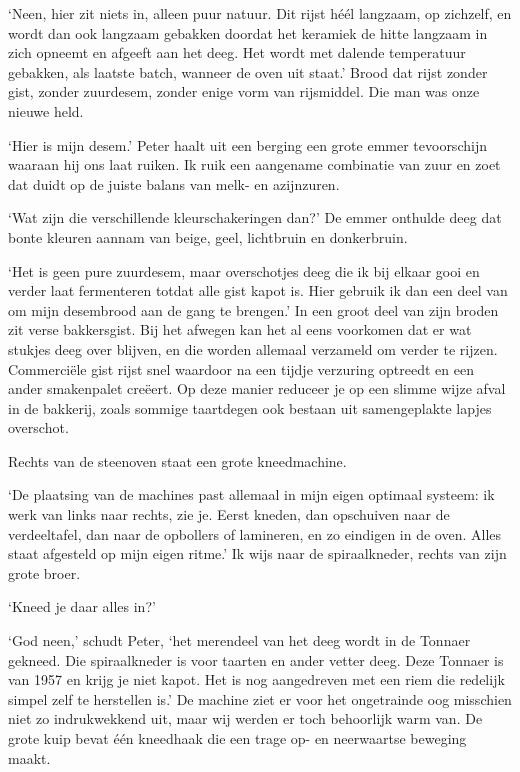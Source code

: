 \documentclass[
  11pt,
  dutch,
]{memoir}
\begin{document}
`Neen, hier zit niets in, alleen puur natuur. Dit rijst héél langzaam,
op zichzelf, en wordt dan ook langzaam gebakken doordat het keramiek de
hitte langzaam in zich opneemt en afgeeft aan het deeg. Het wordt met
dalende temperatuur gebakken, als laatste batch, wanneer de oven uit
staat.' Brood dat rijst zonder gist, zonder zuurdesem, zonder enige vorm
van rijsmiddel. Die man was onze nieuwe held.

`Hier is mijn desem.' Peter haalt uit een berging een grote emmer
tevoorschijn waaraan hij ons laat ruiken. Ik ruik een aangename
combinatie van zuur en zoet dat duidt op de juiste balans van melk- en
azijnzuren.

`Wat zijn die verschillende kleurschakeringen dan?' De emmer onthulde
deeg dat bonte kleuren aannam van beige, geel, lichtbruin en
donkerbruin.

`Het is geen pure zuurdesem, maar overschotjes deeg die ik bij elkaar
gooi en verder laat fermenteren totdat alle gist kapot is. Hier gebruik
ik dan een deel van om mijn desembrood aan de gang te brengen.' In een
groot deel van zijn broden zit verse bakkersgist. Bij het afwegen kan
het al eens voorkomen dat er wat stukjes deeg over blijven, en die
worden allemaal verzameld om verder te rijzen. Commerciële gist rijst
snel waardoor na een tijdje verzuring optreedt en een ander smakenpalet
creëert. Op deze manier reduceer je op een slimme wijze afval in de
bakkerij, zoals sommige taartdegen ook bestaan uit samengeplakte lapjes
overschot.

Rechts van de steenoven staat een grote kneedmachine.

`De plaatsing van de machines past allemaal in mijn eigen optimaal
systeem: ik werk van links naar rechts, zie je. Eerst kneden, dan
opschuiven naar de verdeeltafel, dan naar de opbollers of lamineren, en
zo eindigen in de oven. Alles staat afgesteld op mijn eigen ritme.' Ik
wijs naar de spiraalkneder, rechts van zijn grote broer.

`Kneed je daar alles in?'

`God neen,' schudt Peter, `het merendeel van het deeg wordt in de
Tonnaer gekneed. Die spiraalkneder is voor taarten en ander vetter deeg.
Deze Tonnaer is van 1957 en krijg je niet kapot. Het is nog aangedreven
met een riem die redelijk simpel zelf te herstellen is.' De machine ziet
er voor het ongetrainde oog misschien niet zo indrukwekkend uit, maar
wij werden er toch behoorlijk warm van. De grote kuip bevat één
kneedhaak die een trage op- en neerwaartse beweging maakt.
\end{document}
